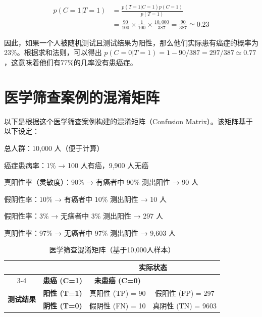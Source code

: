 \documentclass{article}
\begin{document}
\begin{align}
p(C=1|T=1) &= \frac{p(T=1|C=1)p(C=1)}{p(T=1)} \tag{2.21} \\
&= \frac{90}{100}\times\frac{1}{100}\times\frac{10,000}{387}=\frac{90}{387}\simeq 0.23 \tag{2.22}
\end{align}

因此，如果一个人被随机测试且测试结果为阳性，那么他们实际患有癌症的概率为23\%。根据求和法则，可以得出 $p(C=0|T=1)=1-90/387=297/387\simeq 0.77$，这意味着他们有77\%的几率没有患癌症。

\section{医学筛查案例的混淆矩阵}

以下是根据这个医学筛查案例构建的混淆矩阵（Confusion Matrix）。该矩阵基于以下设定：

总人群：10,000 人（便于计算）

癌症患病率：1\% → 100 人有癌，9,900 人无癌

真阳性率（灵敏度）：90\% → 有癌者中 90\% 测出阳性 → 90 人

假阴性率：10\% → 有癌者中 10\% 测出阴性 → 10 人

假阳性率：3\% → 无癌者中 3\% 测出阳性 → 297 人

真阴性率：97\% → 无癌者中 97\% 测出阴性 → 9,603 人

\begin{table}[ht]
\centering
\caption{医学筛查混淆矩阵（基于10,000人样本）}
\label{tab:confusion_matrix}
\begin{tabular}{|c|c|c|c|}
\hline
\multicolumn{2}{|c|}{} & \multicolumn{2}{c|}{\textbf{实际状态}} \\ \cline{3-4} 
\multicolumn{2}{|c|}{} & \textbf{患癌 (C=1)} & \textbf{未患癌 (C=0)} \\ \hline
\multirow{2}{*}{\textbf{测试结果}} & \textbf{阳性 (T=1)} & 真阳性 (TP) = 90 & 假阳性 (FP) = 297 \\ \cline{2-4} 
& \textbf{阴性 (T=0)} & 假阴性 (FN) = 10 & 真阴性 (TN) = 9603 \\ \hline
\end{tabular}
\end{table}
\end{document}
